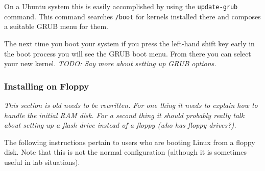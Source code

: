 \documentclass{article}
\newcommand{\command}[1]{\texttt{#1}}
\newcommand{\filename}[1]{\texttt{#1}}
\newcommand{\todo}[1]{\textit{TODO: #1}}
\begin{document}
On a Ubuntu system this is easily accomplished by using the \command{update-grub} command. This
command searches \filename{/boot} for kernels installed there and composes a suitable GRUB menu
for them.

The next time you boot your system if you press the left-hand shift key early in the boot
process you will see the GRUB boot menu. From there you can select your new kernel. \todo{Say
  more about setting up GRUB options.}

\subsubsection{Installing on Floppy}

\textit{This section is old needs to be rewritten. For one thing it needs to explain how to
handle the initial RAM disk. For a second thing it should probably really talk about setting up
a flash drive instead of a floppy (who has floppy drives?).}

The following instructions pertain to users who are booting Linux from a floppy disk. Note that
this is not the normal configuration (although it is sometimes useful in lab situations).
\end{document}
